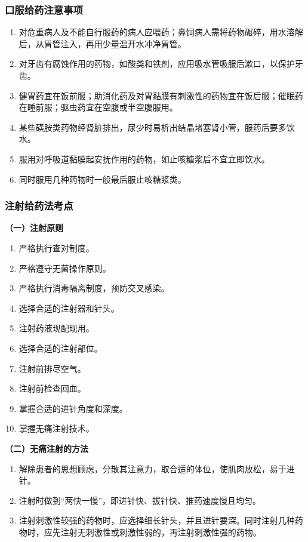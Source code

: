 \documentclass[11pt, a4paper]{ctexart}
\begin{document}
\subsubsection{口服给药注意事项}
\begin{enumerate}
    \item 对危重病人及不能自行服药的病人应喂药；鼻饲病人需将药物碾碎，用水溶解后，从胃管注入，再用少量温开水冲净胃管。
    \item 对牙齿有腐蚀作用的药物，如酸类和铁剂，应用吸水管吸服后漱口，以保护牙齿。
    \item 健胃药宜在饭前服；助消化药及对胃黏膜有刺激性的药物宜在饭后服；催眠药在睡前服；驱虫药宜在空腹或半空腹服用。
    \item 某些磺胺类药物经肾脏排出，尿少时易析出结晶堵塞肾小管，服药后要多饮水。
    \item 服用对呼吸道黏膜起安抚作用的药物，如止咳糖浆后不宜立即饮水。
    \item 同时服用几种药物时一般最后服止咳糖浆类。
\end{enumerate}

\subsubsection{注射给药法考点}
\textbf{（一）注射原则}
\begin{enumerate}
    \item 严格执行查对制度。
    \item 严格遵守无菌操作原则。
    \item 严格执行消毒隔离制度，预防交叉感染。
    \item 选择合适的注射器和针头。
    \item 注射药液现配现用。
    \item 选择合适的注射部位。
    \item 注射前排尽空气。
    \item 注射前检查回血。
    \item 掌握合适的进针角度和深度。
    \item 掌握无痛注射技术。
\end{enumerate}

\textbf{（二）无痛注射的方法}
\begin{enumerate}
    \item 解除患者的思想顾虑，分散其注意力，取合适的体位，使肌肉放松，易于进针。
    \item 注射时做到“两快一慢”，即进针快、拔针快、推药速度慢且均匀。
    \item 注射刺激性较强的药物时，应选择细长针头，并且进针要深。同时注射几种药物时，应先注射无刺激性或刺激性弱的，再注射刺激性强的药物。
\end{enumerate}
\end{document}
